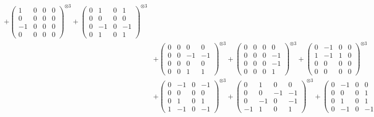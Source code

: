 \documentclass{article}
\begin{document}
{\begin{align}
            + \begin{pmatrix} 1 & 0 & 0 & 0 \\ 0 & 0 & 0 & 0 \\ -1 & 0 & 0 & 0 \\ 0 & 0 & 0 & 0 \end{pmatrix}^{\otimes 3} 
            + \begin{pmatrix} 0 & 1 & 0 & 1 \\ 0 & 0 & 0 & 0 \\ 0 & -1 & 0 & -1 \\ 0 & 1 & 0 & 1 \end{pmatrix}^{\otimes 3} \\
        &+ \label{Rs16-Rc11-Solution-3-c10} \begin{pmatrix} 0 & 0 & 0 & 0 \\ 0 & 0 & -1 & -1 \\ 0 & 0 & 0 & 0 \\ 0 & 0 & 1 & 1 \end{pmatrix}^{\otimes 3} 
            + \begin{pmatrix} 0 & 0 & 0 & 0 \\ 0 & 0 & 0 & -1 \\ 0 & 0 & 0 & -1 \\ 0 & 0 & 0 & 1 \end{pmatrix}^{\otimes 3} 
            + \begin{pmatrix} 0 & -1 & 0 & 0 \\ 1 & -1 & 1 & 0 \\ 0 & 0 & 0 & 0 \\ 0 & 0 & 0 & 0 \end{pmatrix}^{\otimes 3} \\
        &+ \label{Rs16-Rc11-Solution-3-c13} \begin{pmatrix} 0 & -1 & 0 & -1 \\ 0 & 0 & 0 & 0 \\ 0 & 1 & 0 & 1 \\ 1 & -1 & 0 & -1 \end{pmatrix}^{\otimes 3} 
            + \begin{pmatrix} 0 & 1 & 0 & 0 \\ 0 & 0 & -1 & -1 \\ 0 & -1 & 0 & -1 \\ -1 & 1 & 0 & 1 \end{pmatrix}^{\otimes 3} 
            + \begin{pmatrix} 0 & -1 & 0 & 0 \\ 0 & 0 & 0 & 1 \\ 0 & 1 & 0 & 1 \\ 0 & -1 & 0 & -1 \end{pmatrix}^{\otimes 3} \\

\end{align}}
\end{document}
